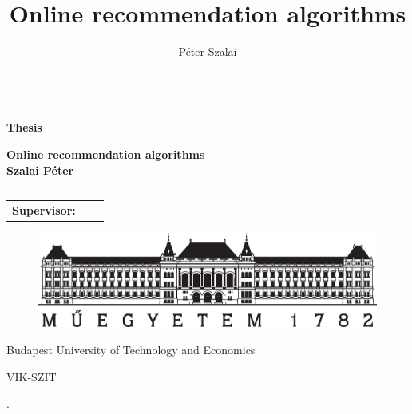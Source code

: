 \documentclass[a4paper,11pt,oneside]{report}
\title{Online recommendation algorithms}
\author{P\'eter Szalai}
\begin{document}

\thispagestyle{empty}
\begin{center}

{ $\left. \right.$ \\ \vspace{0.5cm} \large \textbf{Thesis} \\ }
\vspace{2cm}

{ \large \textbf{Online recommendation algorithms} \\
\vspace{1cm}  
\textbf{Szalai P\'eter} \\ }
\vspace{2cm}

\begin{tabular}{c}

\end{tabular}

\begin{tabular}{l l l }
 {\bf Supervisor:}
\end{tabular}

\vspace*{2cm}


\begin{figure}[h]
\centering
\includegraphics[scale=.4]{tex/pic/bme_logo.eps}
\end{figure}
\vspace*{-.25cm}
\begin{center}
{\normalsize \rmfamily Budapest University of Technology and Economics}
\end{center}
\vspace*{-.5cm}
\begin{center}
{\normalsize \rmfamily VIK-SZIT}
\end{center}

\begin{center}
{\normalsize {}.}
\end{center} 

\end{center}
\newpage

\tableofcontents
{}

\setcounter{page}{1}






\newpage
\begin{thebibliography}{9}

\end{thebibliography}
\end{document}
